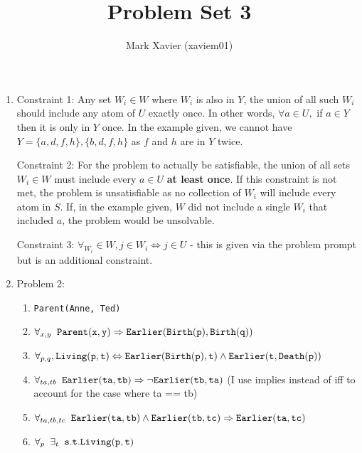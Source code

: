 \documentclass{article}
\title{Problem Set 3}
\author{Mark Xavier (xaviem01)}
\begin{document}
	\maketitle
	
	\begin{enumerate}
		
		\item Constraint 1: Any set $W_i \in W$ where $W_i$ is also in $Y$, the union of all such $W_i$ should include any atom of $U$ exactly once.  In other words, $\forall a \in U,$ if $a \in Y$ then it is only in $Y$ once. In the example given, we cannot have $Y=\{a,d,f,h\}, \{b,d,f,h\}$ as $f$ and $h$ are in $Y$ twice.
		
		Constraint 2: For the problem to actually be satisfiable, the union of all sets $W_i \in W$ must include every $a \in U$ \textbf{at least once}.  If this constraint is not met, the problem is unsatisfiable as no collection of $W_i$ will include every atom in $S$.  If, in the example given, $W$ did not include a single $W_i$ that included $a$, the problem would be unsolvable.
		
		Constraint 3: $\forall_{W_i} \in W, j \in W_i \Leftrightarrow j \in U$ - this is given via the problem prompt but is an additional constraint. 
		
		\item Problem 2:
			
			\begin{enumerate}
				
				\item {\tt Parent(Anne, Ted)}
				
				\item $\forall_{x, y} \phantom{a} {\tt Parent(x, y) \Rightarrow Earlier(Birth(p), Birth(q))}$
				
				\item $\forall_{p,q}, {\tt Living(p, t) \Leftrightarrow Earlier(Birth(p), t) \wedge Earlier(t, Death(p))}$
				
				\item $\forall_{ta, tb} \phantom{a} {\tt Earlier(ta,tb) \Rightarrow \neg Earlier(tb,ta)}$ (I use implies instead of iff to account for the case where ta == tb)
				
				\item $\forall_{ta,tb,tc} \phantom{a} {\tt Earlier(ta,tb) \wedge Earlier(tb, tc) \Rightarrow Earlier(ta, tc)}$
				
				\item $\forall_p \phantom{a} \exists_t \phantom{a} {\tt s.t. Living(p,t)}$
				

\end{enumerate}
\end{enumerate}
\end{document}
